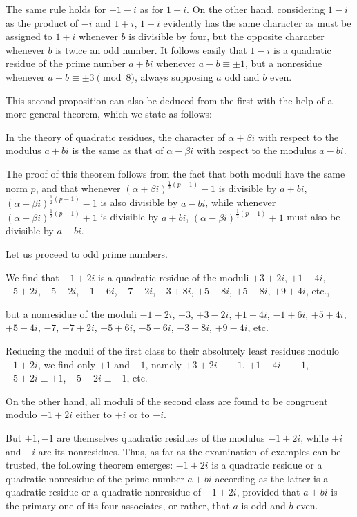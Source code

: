 The same rule holds for $-1-i$ as for $1+i$. On the other hand, considering $1-i$ as the product of $-i$ and $1+i$, $1-i$ evidently has the same character as must be assigned to $1+i$ whenever $b$ is divisible by four, but the opposite character whenever $b$ is twice an odd number. It follows easily that $1-i$ is a quadratic residue of the prime number $a+bi$ whenever $a-b\equiv\pm1$, but a nonresidue whenever $a-b\equiv\pm3\pmod8$, always supposing $a$ odd and $b$ even.

This second proposition can also be deduced from the first with the help of a more general theorem, which we state as follows:

%
In the theory of quadratic residues, the character of $\alpha+\beta i$ with respect to the modulus $a+bi$ is the same as that of $\alpha-\beta i$ with respect to the modulus $a-bi$.

The proof of this theorem follows from the fact that both moduli have the same norm $p$, and that whenever $(\alpha+\beta i)^{\frac12(p-1)}-1$ is divisible by $a+bi$, $(\alpha-\beta i)^{\frac12(p-1)}-1$ is also divisible by $a-bi$, while whenever $(\alpha+\beta i)^{\frac12(p-1)}+1$ is divisible by $a+bi$, $(\alpha-\beta i)^{\frac12(p-1)}+1$ must also be divisible by $a-bi$.

Let us proceed to odd prime numbers.

We find that $-1+2i$ is a quadratic residue of the moduli $+3+2i$, $+1-4i$, $-5+2i$, $-5-2i$, $-1-6i$, $+7-2i$, $-3+8i$, $+5+8i$, $+5-8i$, $+9+4i$, etc.,

but a nonresidue of the moduli $-1-2i$, $-3$, $+3-2i$, $+1+4i$, $-1+6i$, $+5+4i$, $+5-4i$, $-7$, $+7+2i$, $-5+6i$, $-5-6i$, $-3-8i$, $+9-4i$, etc.

Reducing the moduli of the first class to their absolutely least residues modulo $-1+2i$, we find only $+1$ and $-1$, namely $+3+2i\equiv-1$, $+1-4i\equiv-1$, $-5+2i\equiv+1$, $-5-2i\equiv-1$, etc.

On the other hand, all moduli of the second class are found to be congruent modulo $-1+2i$ either to $+i$ or to $-i$.

But $+1,-1$ are themselves quadratic residues of the modulus $-1+2i$, while $+i$ and $-i$ are its nonresidues. Thus, as far as the examination of examples can be trusted, the following theorem emerges: $-1+2i$ is a quadratic residue or a quadratic nonresidue of the prime number $a+bi$ according as the latter is a quadratic residue or a quadratic nonresidue of $-1+2i$, provided that $a+bi$ is the primary one of its four associates, or rather, that $a$ is odd and $b$ even.

